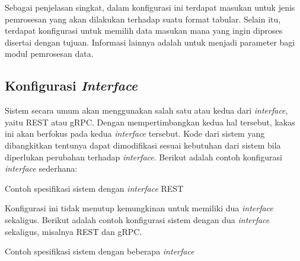 Sebagai penjelasan singkat, dalam konfigurasi ini terdapat masukan untuk jenis pemrosesan yang akan dilakukan terhadap suatu format tabular.
Selain itu, terdapat konfigurasi untuk memilih data masukan mana yang ingin diproses disertai dengan tujuan.
Informasi lainnya adalah untuk menjadi parameter bagi modul pemrosesan data. 

\subsection{Konfigurasi \textit{Interface}}\label{section:03-interface-config}
Sistem secara umum akan menggunakan salah satu atau kedua dari \textit{interface}, yaitu REST atau gRPC.
Dengan mempertimbangkan kedua hal tersebut, kakas ini akan berfokus pada kedua \textit{interface} tersebut.
Kode dari sistem yang dibangkitkan tentunya dapat dimodifikasi sesuai kebutuhan dari sistem bila diperlukan perubahan terhadap \textit{interface}.
Berikut adalah contoh konfigurasi \textit{interface} sederhana:

\begin{code}
	\caption{Contoh spesifikasi sistem dengan \textit{interface} REST}
	\label{listing:8}
\end{code}

Konfigurasi ini tidak menutup kemungkinan untuk memiliki dua \textit{interface} sekaligus.
Berikut adalah contoh konfigurasi sistem dengan dua \textit{interface} sekaligus, misalnya REST dan gRPC.

\begin{code}
	\caption{Contoh spesifikasi sistem dengan beberapa \textit{interface}}
	\label{listing:9}
\end{code}
